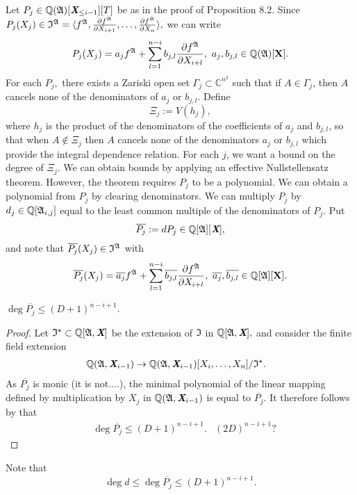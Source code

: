 \documentclass[sigconf]{acmart}
\def\Xb{\textit{\textbf{X}}}
\def\ajb{\overline{a_j}}
\def\bjb{\overline{b_{j,l}}}
\def\pjb{\overline{P_{j}}}
\def\C{\mathbb{C}}
\def\Q{\mathbb{Q}}
\def\I{\frak{I}}
\def\Is{\frak{I}^{\star}}
\def\A{\frak{A}}
\begin{document}
%
%
Let $P_{j} \in \mathbb{Q}(\frak{A})[\Xb_{\leq i-1}][T]$ be as in the proof of Proposition 8.2. Since $P_{j}(X_j) \in\I^{\A}= \langle f^\A,\frac{\partial f^\A}{\partial X_{i+1}},\hdots,\frac{\partial f^\A}{\partial X_n} \rangle,$
 we can write
\[
P_{j}(X_j) = a_j f^{\A} + \sum_{l=1}^{n-i}b_{j,l} \frac{\partial f^\A}{\partial X_{i+l}}, ~a_j,b_{j,l} \in \mathbb{Q}(\A)[\textbf{X}].
\]
For each $P_j,$ there exists a Zariski open set $\Gamma_j \subset \C^{n^2}$ such that if $A \in \Gamma_j$,
then $A$ cancels none of the denominators of $a_{j}$ or $b_{j,l}$. Define 
\[
\Xi_j:=V(h_j), 
\]
where $h_j$ is the product of the denominators of the coefficients of $a_j$ and $b_{j,l}$, so that when $A \not \in \Xi_j$ then $A$ cancels none of the denominators $a_{j}$ or $b_{j,l}$ which provide the integral dependence relation. For each $j$, we want a bound on the degree of $\Xi_j$. We can obtain bounds by applying an effective Nullstellensatz theorem. However, the theorem requires $P_{j}$ to be a polynomial. We can obtain a polynomial from $P_{j}$ by clearing denominators. We can multiply $P_{j}$ by $d_j \in \Q[\A_{i,j}]$ equal to the least common multiple of the denominators of $P_{j}.$ Put 
\[
\overline{P_{j}} := dP_{j}\in \Q[\A][\textit{\textbf{X}}],
\]
and note that $\pjb(X_j) \in \I^{\A}$ with 
\[
\pjb(X_j) = \ajb f^{\A} + \sum_{l=1}^{n-i}\bjb \frac{\partial f^\A}{\partial X_{i+l}}, ~\ajb,\bjb \in \mathbb{Q}[\A][\textbf{X}].
\]
\begin{proposition} 
$\deg \pjb\leq (D+1)^{n-i+1}.$ 
\end{proposition} 
\begin{proof}
Let $\Is \subset \Q[\A,\Xb]$ be the extension of $\I$ in  $\Q[\A,\Xb],$ and consider the finite field extension
\begin{align*}
    \Q(\A,\Xb_{i-1}) &\rightarrow \Q(\A,\Xb_{i-1})[X_i,\hdots,X_n]/\Is.
\end{align*}
%
As $\pjb$ is monic (it is not....), the minimal polynomial of the linear mapping defined by multiplication by $X_j$ in $\Q(\A,\Xb_{i-1})$ is equal to $\pjb$. It therefore follows by \cite[Proposition 1]{CGR} that
\begin{align*}
&\deg \pjb \leq (D+1)^{n-i+1}.&(2D)^{n-i+1}\textrm{?} 
\end{align*}
\end{proof}
Note that 
\[
\deg d \leq \deg \pjb \leq (D+1)^{n-i+1}.
\]
%
%
%
\end{document}
